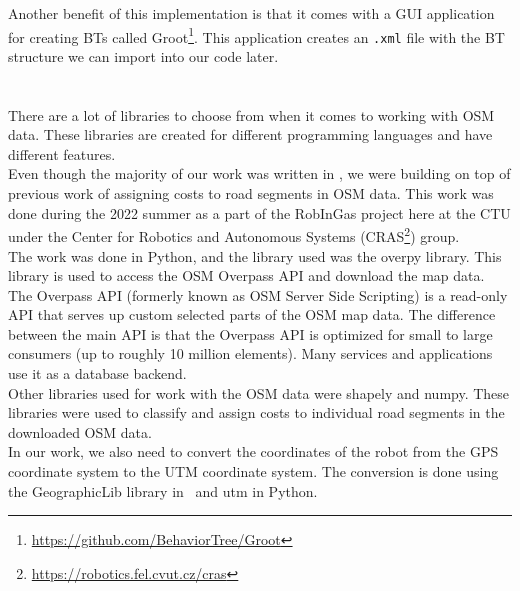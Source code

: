         Another benefit of this implementation is that it comes with a GUI application for creating BTs called Groot\footnote{\url{https://github.com/BehaviorTree/Groot}}. This application creates an \texttt{.xml} file with the BT structure we can import into our code later.\\\\
    \\
        There are a lot of libraries to choose from when it comes to working with OSM data. These libraries are created for different programming languages and have different features.\\
        Even though the majority of our work was written in \CC, we were building on top of previous work of assigning costs to road segments in OSM data. This work was done during the 2022 summer as a part of the RobInGas project here at the CTU under the Center for Robotics and Autonomous Systems (CRAS\footnote{\url{https://robotics.fel.cvut.cz/cras}}) group.\\
        The work was done in Python, and the library used was the overpy library. This library is used to access the OSM Overpass API and download the map data. The Overpass API (formerly known as OSM Server Side Scripting) is a read-only API that serves up custom selected parts of the OSM map data. The difference between the main API is that the Overpass API is optimized for small to large consumers (up to roughly 10 million elements). Many services and applications use it as a database backend.\cite{Overpass}\\
        Other libraries used for work with the OSM data were shapely and numpy. These libraries were used to classify and assign costs to individual road segments in the downloaded OSM data.\\
        In our work, we also need to convert the coordinates of the robot from the GPS coordinate system to the UTM coordinate system. The conversion is done using the GeographicLib library in \CC\ and utm in Python.
        